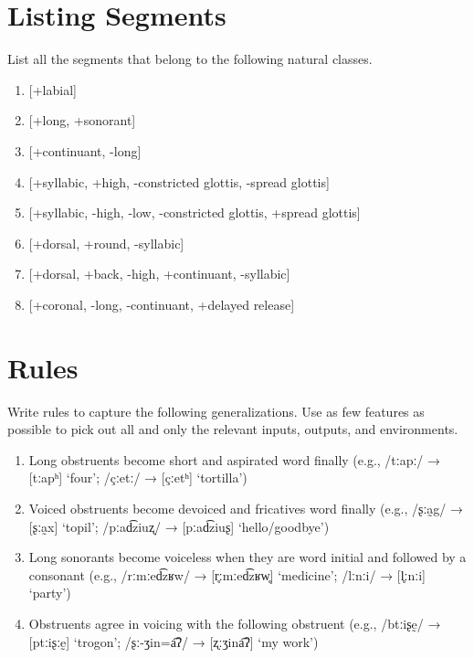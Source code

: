 \documentclass[12pt, letterpaper]{article}
\begin{document}
\section{Listing Segments} 

List all the segments that belong to the following natural classes.

\begin{enumerate}
	\item {}[+labial] 
	\item {}[+long, +sonorant] 
	\item {}[+continuant, -long] 
	\item {}[+syllabic, +high, -constricted glottis, -spread glottis] 
	\item {}[+syllabic, -high, -low, -constricted glottis, +spread glottis] 
	\item {}[+dorsal, +round, -syllabic]
	\item {}[+dorsal, +back, -high, +continuant, -syllabic] 
	\item {}[+coronal, -long, -continuant, +delayed release] 
\end{enumerate}

\section{Rules} 

Write rules to capture the following generalizations. Use as few features as possible to pick out all and only the relevant inputs, outputs, and environments.

\begin{enumerate}
	\item Long obstruents become short and aspirated word finally (e.g., /tːapː/ → [tːapʰ] `four'; /çːetː/ → [çːetʰ] `tortilla')
	\vspace{0.75cm}
	\item Voiced obstruents become devoiced and fricatives word finally (e.g., /ʂːa̰g/ → [ʂːa̰x] `topil'; /pːad͡ziuʐ/ → [pːad͡ziuʂ] `hello/goodbye')
	\vspace{0.75cm}
	\item Long sonorants become voiceless when they are word initial and followed by a consonant (e.g., /rːmːed͡zʁw/ → [r̥ːmːed͡zʁw̥] `medicine'; /lːnːi/ → [l̥ːnːi] `party')
	\vspace{0.75cm}
	\item Obstruents agree in voicing with the following obstruent (e.g., /btːiʂḛ/ → [ptːiʂːḛ] `trogon'; /ʂː-ʒin=a͡ʔ/ → [ʐːʒina͡ʔ] `my work')
\end{enumerate}
\end{document}
